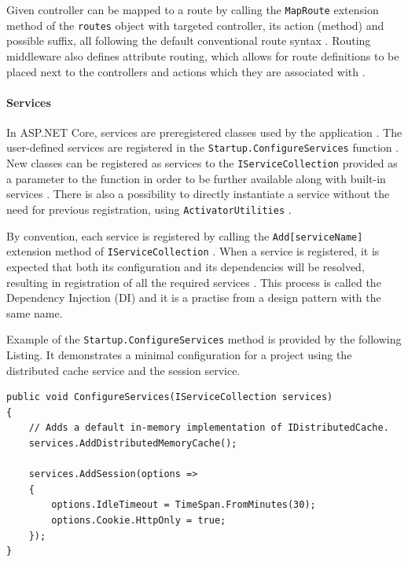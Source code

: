 Given controller can be mapped to a route by calling the \texttt{MapRoute} extension method of the \texttt{routes} object with targeted controller, its action (method) and possible suffix, all following the default conventional route syntax \citep{microsoft.docs}. Routing middleware also defines attribute routing, which allows for route definitions to be placed next to the controllers and actions which they are associated with \citep{microsoft.docs}. 

\paragraph{Services}
In ASP.NET Core, services are preregistered classes used by the application \citep{microsoft.docs}. The user-defined services are registered in the \texttt{Startup.ConfigureServices} function \citep{microsoft.docs}. New classes can be registered as services to the \texttt{IServiceCollection} provided as a parameter to the function in order to be further available along with built-in services \citep{microsoft.docs}. There is also a possibility to directly instantiate a service without the need for previous registration, using \texttt{ActivatorUtilities} \citep{microsoft.docs}.

By convention, each service is registered by calling the \texttt{Add[serviceName]} extension method of \texttt{IServiceCollection} \citep{microsoft.docs}. When a service is registered, it is expected that both its configuration and its dependencies will be resolved, resulting in registration of all the required services \citep{microsoft.docs}. This process is called the Dependency Injection (DI) and it is a practise from a design pattern with the same name.

Example of the \texttt{Startup.ConfigureServices} method is provided by the following Listing. It demonstrates a minimal configuration for a project using the distributed cache service and the session service.
\begin{center}
\lstset{language=[Sharp]C}
\begin{lstlisting}[caption={Startup.ConfigureServices method},captionpos=b]
public void ConfigureServices(IServiceCollection services)
{
	// Adds a default in-memory implementation of IDistributedCache.
	services.AddDistributedMemoryCache();

	services.AddSession(options =>
	{
		options.IdleTimeout = TimeSpan.FromMinutes(30);
		options.Cookie.HttpOnly = true;
	});
}
\end{lstlisting}
\end{center}





